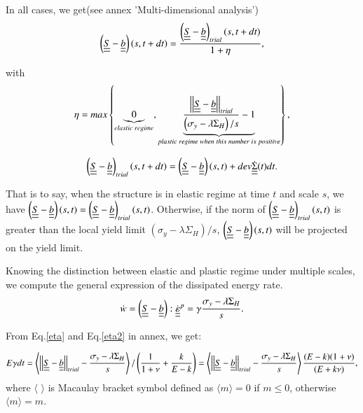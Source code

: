 \documentclass[3p,times,number,review]{elsarticle}
\begin{document}
In all cases, we get(see annex 'Multi-dimensional analysis')
\begin{equation}
\left( \uline{\uline{S}}-\uline{\uline{b}}\right) (s,t+dt)=\dfrac{\left( \uline{\uline{S}}-\uline{\uline{b}}\right)_{trial} (s,t+dt)}{1+\eta},
\end{equation}

with $$\eta=max\left\lbrace \underbrace{0}_{elastic\; regime}, \underbrace{\dfrac{\left| \left|\uline{\uline{S}}-\uline{\uline{b}}\right| \right|_{trial}}{\left( \sigma_y-\lambda \Sigma_H\right)/s}-1}_{plastic \; regime\; when\; this\; number\; is\; positive}\right\rbrace, $$

$$\left( \uline{\uline{S}}-\uline{\uline{b}}\right)_{trial} (s,t+dt)=\left( \uline{\uline{S}}-\uline{\uline{b}}\right)(s,t)+dev\dot{\uline{\uline{\Sigma}}}(t)dt.$$

 That is to say, when the structure is in elastic regime at time $t$ and scale $s$, we have $\left( \uline{\uline{S}}-\uline{\uline{b}}\right)(s,t)=\left( \uline{\uline{S}}-\uline{\uline{b}}\right)_{trial} (s,t)$. Otherwise, if  the norm of $\left( \uline{\uline{S}}-\uline{\uline{b}}\right)_{trial} (s,t)$ is greater than the local yield limit $\left( \sigma_y-\lambda \Sigma_H\right)/s$, $\left( \uline{\uline{S}}-\uline{\uline{b}}\right)(s,t)$ will be projected on the yield limit. 
 
Knowing the distinction between elastic and plastic regime under multiple scales, we compute the general expression of the dissipated energy rate.
\begin{equation}
\dot{w}=\left( \uline{\uline{S}}-\uline{\uline{b}}\right) :\dot{\uline{\uline{\varepsilon}}}^p=\gamma\dfrac{ \sigma_y-\lambda \Sigma_H}{s}.
\label{w}
\end{equation}

From Eq.\eqref{eta} and Eq.\eqref{eta2} in annex, we get:

\begin{equation}E\gamma dt=\left\langle \left| \left|\uline{\uline{S}}-\uline{\uline{b}}\right| \right|_{trial}-\dfrac{\sigma_y-\lambda \Sigma_H}{s}\right\rangle /\left(\dfrac{1}{1+\nu}+\dfrac{k}{E-k} \right)=\left\langle \left| \left|\uline{\uline{S}}-\uline{\uline{b}}\right| \right|_{trial}-\dfrac{\sigma_y-\lambda \Sigma_H}{s}\right\rangle\dfrac{(E-k)(1+\nu) }{(E+k\nu)},
\label{gamma}
\end{equation}
where $\langle$ $\rangle$ is Macaulay bracket symbol defined as $\langle m\rangle=0$ if $m\leqslant0$, otherwise $\langle m\rangle=m$.
\end{document}
